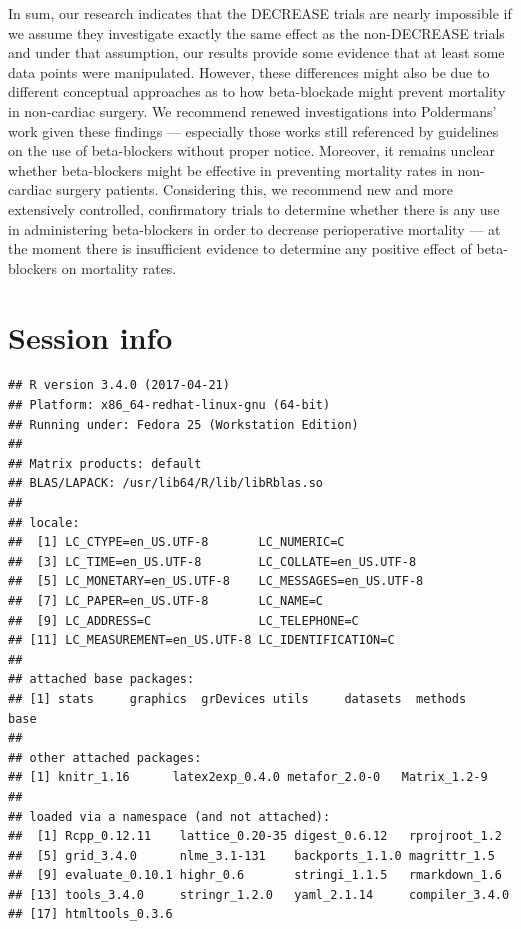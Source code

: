 \documentclass[]{article}
\begin{document}
In sum, our research indicates that the DECREASE trials are nearly
impossible if we assume they investigate exactly the same effect as the
non-DECREASE trials and under that assumption, our results provide some
evidence that at least some data points were manipulated. However, these
differences might also be due to different conceptual approaches as to
how beta-blockade might prevent mortality in non-cardiac surgery. We
recommend renewed investigations into Poldermans' work given these
findings --- especially those works still referenced by guidelines on
the use of beta-blockers without proper notice. Moreover, it remains
unclear whether beta-blockers might be effective in preventing mortality
rates in non-cardiac surgery patients. Considering this, we recommend
new and more extensively controlled, confirmatory trials to determine
whether there is any use in administering beta-blockers in order to
decrease perioperative mortality --- at the moment there is insufficient
evidence to determine any positive effect of beta-blockers on mortality
rates.

\section{Session info}\label{session-info}

\begin{verbatim}
## R version 3.4.0 (2017-04-21)
## Platform: x86_64-redhat-linux-gnu (64-bit)
## Running under: Fedora 25 (Workstation Edition)
## 
## Matrix products: default
## BLAS/LAPACK: /usr/lib64/R/lib/libRblas.so
## 
## locale:
##  [1] LC_CTYPE=en_US.UTF-8       LC_NUMERIC=C              
##  [3] LC_TIME=en_US.UTF-8        LC_COLLATE=en_US.UTF-8    
##  [5] LC_MONETARY=en_US.UTF-8    LC_MESSAGES=en_US.UTF-8   
##  [7] LC_PAPER=en_US.UTF-8       LC_NAME=C                 
##  [9] LC_ADDRESS=C               LC_TELEPHONE=C            
## [11] LC_MEASUREMENT=en_US.UTF-8 LC_IDENTIFICATION=C       
## 
## attached base packages:
## [1] stats     graphics  grDevices utils     datasets  methods   base     
## 
## other attached packages:
## [1] knitr_1.16      latex2exp_0.4.0 metafor_2.0-0   Matrix_1.2-9   
## 
## loaded via a namespace (and not attached):
##  [1] Rcpp_0.12.11    lattice_0.20-35 digest_0.6.12   rprojroot_1.2  
##  [5] grid_3.4.0      nlme_3.1-131    backports_1.1.0 magrittr_1.5   
##  [9] evaluate_0.10.1 highr_0.6       stringi_1.1.5   rmarkdown_1.6  
## [13] tools_3.4.0     stringr_1.2.0   yaml_2.1.14     compiler_3.4.0 
## [17] htmltools_0.3.6
\end{verbatim}
\end{document}
